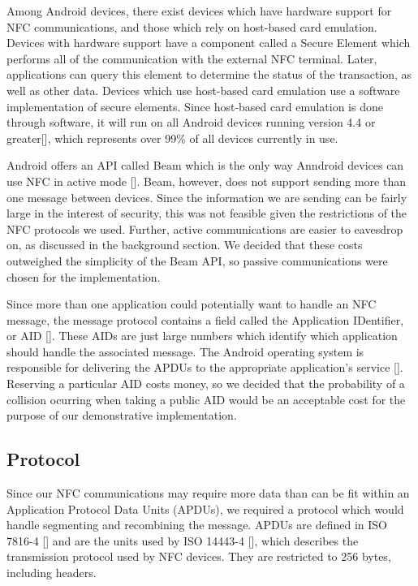 \documentclass[12pt]{report}
\begin{document}
Among Android devices, there exist devices which have hardware support for NFC communications, and those which rely on
host-based card emulation. Devices with hardware support have a component called a Secure Element which performs all of
the communication with the external NFC terminal. Later, applications can query this element to determine the status of
the transaction, as well as other data. Devices which use host-based card emulation use a software implementation of
secure elements. Since host-based card emulation is done through software, it will run on all Android devices running
version 4.4 or greater[], which represents over 99\% of all devices currently in use.

Android offers an API called Beam which is the only way Anndroid devices can use NFC in active mode []. Beam,
however, does not support sending more than one message between devices. Since the information we are sending can be
fairly large in the interest of security, this was not feasible given the restrictions of the NFC protocols we used.
Further, active communications are easier to eavesdrop on, as discussed in the background section. We decided that these
costs outweighed the simplicity of the Beam API, so passive communications were chosen for the implementation.

Since more than one application could potentially want to handle an NFC message, the message protocol contains a field
called the Application IDentifier, or AID []. These AIDs are just large numbers which identify which application should
handle the associated message. The Android operating system is responsible for delivering the APDUs to the
appropriate application's service []. Reserving a particular AID costs money, so we decided that the probability of a
collision ocurring when taking a public AID would be an acceptable cost for the purpose of our demonstrative
implementation.


\subsection{Protocol}

Since our NFC communications may require more data than can be fit within an Application Protocol Data Units (APDUs), we
required a protocol which would handle segmenting and recombining the message. APDUs are defined in ISO 7816-4 [] and are
the units used by ISO 14443-4 [], which describes the transmission protocol used by NFC devices. They are restricted to
256 bytes, including headers.
\end{document}

